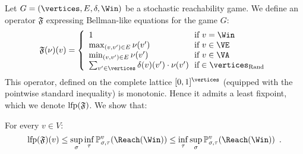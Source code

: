 Let $G = (\vertices,E,\delta,\Win)$ be a stochastic reachability
game.  We define an operator $\mathfrak{F}$ expressing Bellman-like
equations for the game $G$:
\[
\mathfrak{F}(\nu)(v) = \left\{\begin{array}{l@{~~}l}
    1 & \text{if}\ v = \Win \\
    \max_{(v,v') \in E} \nu(v') & \text{if}\ v \in \VE \\
    \min_{(v,v') \in E} \nu(v') & \text{if}\ v \in \VA \\
    \sum_{v' \in \vertices} \delta(v)(v') \cdot \nu(v') & \text{if} \in \Randomvertices
  \end{array}\right.
\]
This operator, defined on the complete lattice $[0,1]^{\vertices}$
(equipped with the pointwise standard inequality) is
monotonic. Hence it admits a least fixpoint, which we denote
$\textrm{lfp}(\mathfrak{F})$.  We show that:
\begin{lemma}
\label{6-lem:lfpgeval}
For every $v \in V$:
  \[
  \lfp(\mathfrak{F}) (v) \le \sup_\sigma \inf_\tau
  \probm_{\sigma,\tau}^v(\Reach(\Win)) \le \inf_\tau \sup_\sigma
  \probm_{\sigma,\tau}^v(\Reach(\Win)) \enspace.
  \]
\end{lemma}
